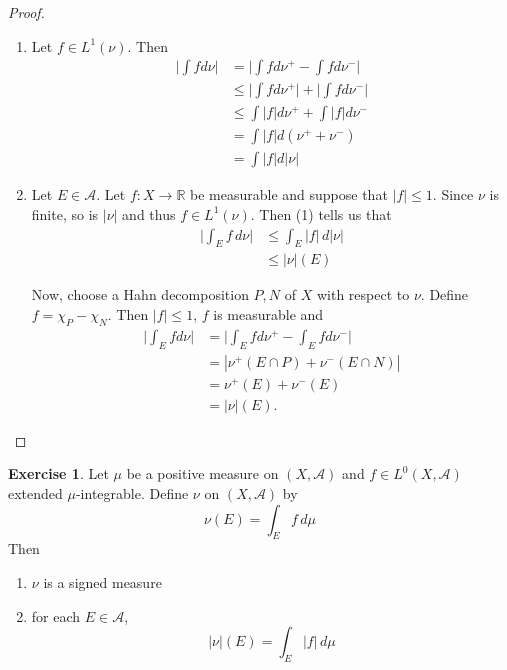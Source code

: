 \documentclass{book}
\theoremstyle{definition}
\newtheorem{ex}[definition]{Exercise}
\newcommand{\R}{\mathbb{R}}
\newcommand{\MA}{\mathcal{A}}
\newcommand{\lex}[1]{\label{ex:#1}}
\DeclareMathOperator*{\0}{\mbf{0}}
\DeclareMathOperator*{\1}{\mbf{1}}
\newcommand{\dmu}{\, d \mu}
\newcommand{\dnu}{\, d \nu}
\begin{document}
	\begin{proof}
		\begin{enumerate}
			\item Let $f \in L^1(\nu)$. Then 
			\begin{align*}
				\bigg|\int f d \nu \bigg| 
				&= \bigg|\int f d \nu^+ - \int f d \nu^-\bigg|\\
				& \leq \bigg|\int f d \nu^+\bigg| + \bigg|\int f d \nu^-\bigg|\\
				& \leq \int |f| d\nu^+ + \int |f| d\nu^-\\
				&= \int |f| d (\nu^+ + \nu^-)\\
				&= \int |f| d |\nu|
			\end{align*}
			
			\item Let $E \in \MA$. Let $f:X \rightarrow \R$ be measurable and suppose that $|f| \leq 1$. Since $\nu$ is finite, so is $|\nu|$ and thus $f \in L^1(\nu)$. Then (1) tells us that 
			\begin{align*}
				\bigg |\int_E f \dnu \bigg| 
				& \leq \int_E |f| \, d |\nu|\\
				& \leq |\nu|(E) 
			\end{align*}
			
			Now, choose a Hahn decomposition $P,N$ of $X$ with respect to $\nu$. Define $f = \chi_{P} - \chi_{N}$. Then $|f| \leq 1$, $f$ is measurable and 
			\begin{align*}
				\bigg|\int_E f d\nu\bigg|
				&= \bigg|\int_E f d \nu^+ - \int_E f d \nu^-\bigg|\\
				&= | \nu^+(E \cap P) + \nu^-(E \cap N)|\\
				&= \nu^+(E) + \nu^-(E)\\
				&= |\nu|(E).
			\end{align*}
			
		\end{enumerate}
	\end{proof}
	
	\begin{ex} \lex{41016} 
		Let $\mu$ be a positive measure on $(X, \MA)$ and $f \in L^0(X, \MA)$ extended $\mu$-integrable. Define $\nu$ on $(X, \MA)$ by $$\nu(E) = \int_E f \dmu$$ Then
		\begin{enumerate}
			\item $\nu$ is a signed measure
			\item for each $E\in \MA$, $$|\nu|(E) = \int_E|f|\dmu$$
		\end{enumerate} 
	\end{ex}
	
\end{document}
